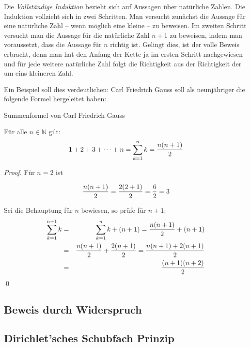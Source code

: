 Die \textsl{Vollständige Induktion} bezieht sich auf Aussagen über natürliche Zahlen. Die Induktion vollzieht sich in zwei Schritten. Man versucht zunächst die Aussage für eine natürliche Zahl -- wenn möglich eine kleine -- zu beweisen. Im zweiten Schritt versucht man die Aussage für die natürliche Zahl $n+1$ zu beweisen, indem man voraussetzt, dass die Aussage für $n$ richtig ist. Gelingt dies, ist der volle Beweis erbracht, denn man hat den Anfang der Kette ja im ersten Schritt nachgewiesen und für jede weitere natürliche Zahl folgt die Richtigkeit aus der Richtigkeit der um eins kleineren Zahl.

Ein Beispiel soll dies verdeutlichen: Carl Friedrich Gauss soll als neunjähriger die folgende Formel hergeleitet haben:

\begin{theorem}
Summenformel von Carl Friedrich Gauss
\begin{claim}
Für alle $n\in \mathbb{N}$ gilt:
\[ 1+2+3+ \dots +n = \sum_{k=1}^{n}k = {n(n+1)\over 2} \]
\end{claim}
\begin{proof}
Für $n=2$ ist

\[ {n(n+1)\over 2} = {2(2+1)\over 2} = {6\over 2} = 3 \]

Sei die Behauptung für $n$ bewiesen, so prüfe für $n+1$:
\begin{eqnarray*}
\sum_{k=1}^{n+1} k &=& \sum_{k=1}^{n} k  + (n+1) = {n(n+1)\over 2} +(n+1) \\
 &=& {n(n+1)\over 2} +{2(n+1)\over 2} = {n(n+1)+2(n+1) \over 2} \\
 &=& {(n+1)(n+2) \over 2}
\end{eqnarray*}
\qed
\end{proof}

\end{theorem}


\subsection{Beweis durch Widerspruch}

\subsection{Dirichlet'sches Schubfach Prinzip}
